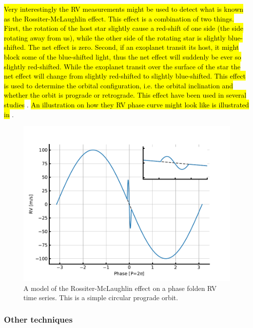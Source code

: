 \hl{Very interestingly the RV measurements might be used to detect what is known as the
Rossiter-McLaughlin effect. This effect is a combination of two things. First, the rotation of the
host star slightly cause a red-shift of one side (the side rotating away from us), while the other
side of the rotating star is slightly blue-shifted. The net effect is zero. Second, if an exoplanet
transit its host, it might block some of the blue-shifted light, thus the net effect will suddenly
be ever so slightly red-shifted. While the exoplanet transit over the surface of the star the net
effect will change from slightly red-shifted to slightly blue-shifted. This effect is used to
determine the orbital configuration, i.e. the orbital inclination and whether the orbit is prograde
or retrograde. This effect have been used in several studies} \citep[][to mention just a
few]{Winn2005,Triaud2010}. \hl{An illustration on how they RV phase curve might look like is
illustrated in} .

\begin{figure}[htpb!]
    \centering
    \includegraphics[width=1.0\linewidth]{figures/RMeffect.pdf}
    \caption{A model of the Rossiter-McLaughlin effect on a phase folden RV time series. This is a
             simple circular prograde orbit.}
    \label{fig:RMeffect}
\end{figure}

\subsubsection{Other techniques}

